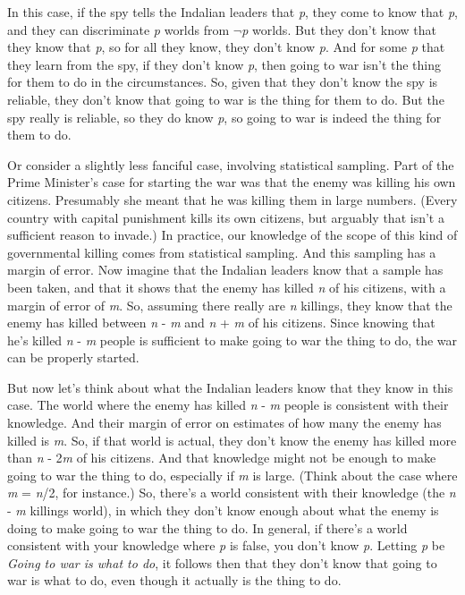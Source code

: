 \documentclass[
  11pt,
  letterpaper,
  DIV=11,
  numbers=noendperiod]{scrartcl}
\begin{document}
In this case, if the spy tells the Indalian leaders that \emph{p}, they
come to know that \emph{p}, and they can discriminate \emph{p} worlds
from \(\neg\)\emph{p} worlds. But they don't know that they know that
\emph{p}, so for all they know, they don't know \emph{p}. And for some
\emph{p} that they learn from the spy, if they don't know \emph{p}, then
going to war isn't the thing for them to do in the circumstances. So,
given that they don't know the spy is reliable, they don't know that
going to war is the thing for them to do. But the spy really is
reliable, so they do know \emph{p}, so going to war is indeed the thing
for them to do.

Or consider a slightly less fanciful case, involving statistical
sampling. Part of the Prime Minister's case for starting the war was
that the enemy was killing his own citizens. Presumably she meant that
he was killing them in large numbers. (Every country with capital
punishment kills its own citizens, but arguably that isn't a sufficient
reason to invade.) In practice, our knowledge of the scope of this kind
of governmental killing comes from statistical sampling. And this
sampling has a margin of error. Now imagine that the Indalian leaders
know that a sample has been taken, and that it shows that the enemy has
killed \emph{n} of his citizens, with a margin of error of \emph{m}. So,
assuming there really are \emph{n} killings, they know that the enemy
has killed between \emph{n} - \emph{m} and \emph{n} + \emph{m} of his
citizens. Since knowing that he's killed \emph{n} - \emph{m} people is
sufficient to make going to war the thing to do, the war can be properly
started.

But now let's think about what the Indalian leaders know that they know
in this case. The world where the enemy has killed \emph{n} - \emph{m}
people is consistent with their knowledge. And their margin of error on
estimates of how many the enemy has killed is \emph{m}. So, if that
world is actual, they don't know the enemy has killed more than \emph{n}
- 2\emph{m} of his citizens. And that knowledge might not be enough to
make going to war the thing to do, especially if \emph{m} is large.
(Think about the case where \emph{m} = \emph{n}/2, for instance.) So,
there's a world consistent with their knowledge (the \emph{n} - \emph{m}
killings world), in which they don't know enough about what the enemy is
doing to make going to war the thing to do. In general, if there's a
world consistent with your knowledge where \emph{p} is false, you don't
know \emph{p}. Letting \emph{p} be \emph{Going to war is what to do}, it
follows then that they don't know that going to war is what to do, even
though it actually is the thing to do.
\end{document}
